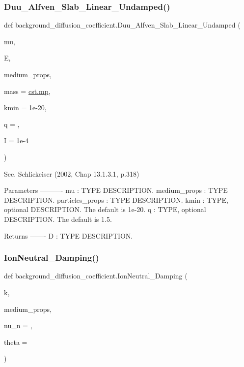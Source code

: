 \subsubsection{\texorpdfstring{Duu\+\_\+\+Alfven\+\_\+\+Slab\+\_\+\+Linear\+\_\+\+Undamped()}{Duu\_Alfven\_Slab\_Linear\_Undamped()}}
{\footnotesize\ttfamily def background\+\_\+diffusion\+\_\+coefficient.\+Duu\+\_\+\+Alfven\+\_\+\+Slab\+\_\+\+Linear\+\_\+\+Undamped (\begin{DoxyParamCaption}\item[{}]{mu,  }\item[{}]{E,  }\item[{}]{medium\+\_\+props,  }\item[{}]{mass = {\ttfamily \hyperlink{constants_8h_a6b331c08a80ed71d31c55a3341776483}{cst.\+mp}},  }\item[{}]{kmin = {\ttfamily 1e-\/20},  }\item[{}]{q = {},  }\item[{}]{I = {\ttfamily 1e-\/4} }\end{DoxyParamCaption})}

\begin{DoxyVerb}See. Schlickeiser (2002, Chap 13.1.3.1, p.318)

Parameters
----------
mu : TYPE
    DESCRIPTION.
medium_props : TYPE
    DESCRIPTION.
particles_props : TYPE
    DESCRIPTION.
kmin : TYPE, optional
    DESCRIPTION. The default is 1e-20.
q : TYPE, optional
    DESCRIPTION. The default is 1.5.

Returns
-------
D : TYPE
    DESCRIPTION.\end{DoxyVerb}
 \mbox{\label{namespacebackground__diffusion__coefficient_aebebdbdd7bf44f9ebd3485b6abe00093}} 
\subsubsection{\texorpdfstring{Ion\+Neutral\+\_\+\+Damping()}{IonNeutral\_Damping()}}
{\footnotesize\ttfamily def background\+\_\+diffusion\+\_\+coefficient.\+Ion\+Neutral\+\_\+\+Damping (\begin{DoxyParamCaption}\item[{}]{k,  }\item[{}]{medium\+\_\+props,  }\item[{}]{nu\+\_\+n = {},  }\item[{}]{theta = {} }\end{DoxyParamCaption})}

